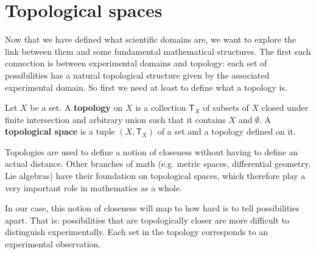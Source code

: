 \documentclass[11pt,letterpaper,fleqn]{memoir} %
\begin{document}
\section{Topological spaces}

Now that we have defined what scientific domains are, we want to explore the link between them and some fundamental mathematical structures. The first such connection is between experimental domains and topology: each set of possibilities has a natural topological structure given by the associated experimental domain. So first we need at least to define what a topology is.

\begin{mathSection}
	\begin{defn}
		Let $X$ be a set. A \textbf{topology} on $X$ is a collection $\mathsf{T}_X$ of subsets of $X$ closed under finite intersection and arbitrary union such that it contains $X$ and $\emptyset$. A \textbf{topological space} is a tuple $(X, \mathsf{T}_X)$ of a set and a topology defined on it.
	\end{defn}
\end{mathSection}

Topologies are used to define a notion of closeness without having to define an actual distance. Other branches of math (e.g. metric spaces, differential geometry, Lie algebras) have their foundation on topological spaces, which therefore play a very important role in mathematics as a whole.

In our case, this notion of closeness will map to how hard is to tell possibilities apart. That is: possibilities that are topologically closer are more difficult to distinguish experimentally. Each set in the topology corresponds to an experimental observation.
\end{document}
